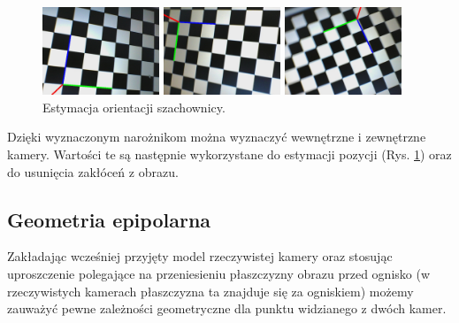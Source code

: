 \documentclass[oneside, eng]{mgr}
\begin{document}
\begin{figure}
\centering
		\begin{minipage}{3.5cm}
			\includegraphics[width=3.5cm]{left8.jpg}
		\end{minipage}
		\begin{minipage}{3.5cm}
			\includegraphics[width=3.5cm]{left17.jpg}
		\end{minipage}
		\begin{minipage}{3.5cm}
			\includegraphics[width=3.5cm]{left24.jpg}
		\end{minipage}
	\caption{Estymacja orientacji szachownicy. }
	\label{fig:pose}
\end{figure}

Dzięki wyznaczonym narożnikom można wyznaczyć wewnętrzne i zewnętrzne kamery. Wartości te są następnie wykorzystane do estymacji pozycji (Rys. \ref{fig:pose}) oraz do usunięcia zakłóceń z obrazu. 

\subsection{Geometria epipolarna}

Zakładając wcześniej przyjęty model rzeczywistej kamery oraz stosując uproszczenie polegające na przeniesieniu płaszczyzny obrazu przed ognisko (w rzeczywistych kamerach płaszczyzna ta znajduje się za ogniskiem) możemy zauważyć pewne zależności geometryczne dla punktu widzianego z dwóch kamer. 
\end{document}
